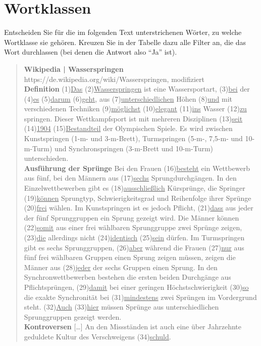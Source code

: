 \section{Wortklassen}\label{sec:bestimmen}

Entscheiden Sie für die im folgenden Text unterstrichenen Wörter, zu welche Wortklasse sie gehören.
Kreuzen Sie in der Tabelle dazu alle Filter an, die das Wort durchlassen (bei denen die Antwort also "`Ja"' ist). 

\begin{nohyphens}\begin{quote}
  \textbf{Wikipedia | Wasserspringen}\\
  https://de.wikipedia.org/wiki/Wasserspringen, modifiziert\\[0.5\baselineskip]
  \textbf{Definition}
  (1)\ul{Das} (2)\ul{Wasserspringen} ist eine Wassersportart, (3)\ul{bei} der (4)\ul{es} (5)\ul{darum} (6)\ul{geht}, aus (7)\ul{unterschiedlichen} Höhen (8)\ul{und} mit verschiedenen Techniken (9)\ul{möglichst} (10)\ul{elegant} (11)\ul{ins} Wasser (12)\ul{zu} springen.
  Dieser Wettkampfsport ist mit mehreren Disziplinen (13)\ul{seit} (14)\ul{1904} (15)\ul{Bestandteil} der Olympischen Spiele.
  Es wird zwischen Kunstspringen (1-m- und 3-m-Brett), Turmspringen (5-m-, 7,5-m- und 10-m-Turm) und Synchronspringen (3-m-Brett und 10-m-Turm) unterschieden.\\[0.5\baselineskip]
  \textbf{Ausführung der Sprünge}
  Bei den Frauen (16)\ul{besteht} ein Wettbewerb aus fünf, bei den Männern aus (17)\ul{sechs} Sprungdurchgängen.
  In den Einzelwettbewerben gibt es (18)\ul{ausschließlich} Kürsprünge, die Springer (19)\ul{können} Sprungtyp, Schwierigkeitsgrad und Reihenfolge ihrer Sprünge (20)\ul{frei} wählen.
  Im Kunstspringen ist es jedoch Pflicht, (21)\ul{dass} aus jeder der fünf Sprunggruppen ein Sprung gezeigt wird.
  Die Männer können (22)\ul{somit} aus einer frei wählbaren Sprunggruppe zwei Sprünge zeigen, (23)\ul{die} allerdings nicht (24)\ul{identisch} (25)\ul{sein} dürfen.
  Im Turmspringen gibt es sechs Sprunggruppen, (26)\ul{aber} während die Frauen (27)\ul{nur} aus fünf frei wählbaren Gruppen einen Sprung zeigen müssen, zeigen die Männer aus (28)\ul{jeder} der sechs Gruppen einen Sprung.
  In den Synchronwettbewerben bestehen die ersten beiden Durchgänge aus Pflichtsprüngen, (29)\ul{damit} bei einer geringen Höchstschwierigkeit (30)\ul{so} die exakte Synchronität bei (31)\ul{mindestens} zwei Sprüngen im Vordergrund steht.
  (32)\ul{Auch} (33)\ul{hier} müssen Sprünge aus unterschiedlichen Sprunggruppen gezeigt werden.\\[0.5\baselineskip]
  \textbf{Kontroversen} [\ldots] An den Missständen ist auch eine über Jahrzehnte geduldete Kultur des Verschweigens (34)\ul{schuld}.
\end{quote}\end{nohyphens}

